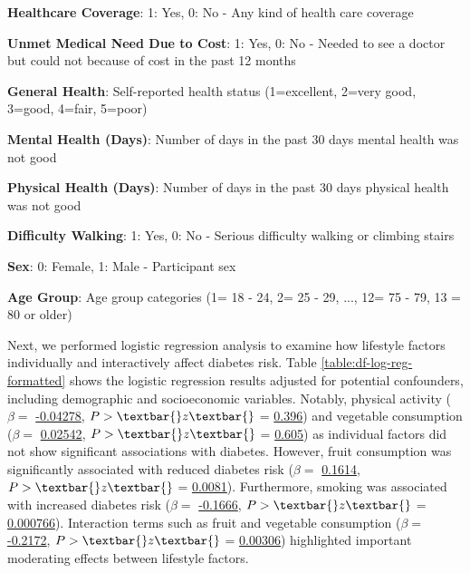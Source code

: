 \documentclass[11pt]{article}
\begin{document}
\begin{table}[h]
\begin{threeparttable}
\begin{tablenotes}
\item \textbf{Healthcare Coverage}: 1: Yes, 0: No - Any kind of health care coverage
\item \textbf{Unmet Medical Need Due to Cost}: 1: Yes, 0: No - Needed to see a doctor but could not because of cost in the past 12 months
\item \textbf{General Health}: Self-reported health status (1=excellent, 2=very good, 3=good, 4=fair, 5=poor)
\item \textbf{Mental Health (Days)}: Number of days in the past 30 days mental health was not good
\item \textbf{Physical Health (Days)}: Number of days in the past 30 days physical health was not good
\item \textbf{Difficulty Walking}: 1: Yes, 0: No - Serious difficulty walking or climbing stairs
\item \textbf{Sex}: 0: Female, 1: Male - Participant sex
\item \textbf{Age Group}: Age group categories (1= 18 - 24, 2= 25 - 29, ..., 12= 75 - 79, 13 = 80 or older)
\end{tablenotes}
\end{threeparttable}
\end{table}


Next, we performed logistic regression analysis to examine how lifestyle factors individually and interactively affect diabetes risk. Table \ref{table:df-log-reg-formatted} shows the logistic regression results adjusted for potential confounders, including demographic and socioeconomic variables. Notably, physical activity (\(\beta =\) \hyperlink{D0a}{-0.04278}, \(P>\textbar{}z\textbar{}\) = \hyperlink{D0d}{0.396}) and vegetable consumption (\(\beta =\) \hyperlink{D3a}{0.02542}, \(P>\textbar{}z\textbar{}\) = \hyperlink{D3d}{0.605}) as individual factors did not show significant associations with diabetes. However, fruit consumption was significantly associated with reduced diabetes risk (\(\beta =\) \hyperlink{D1a}{0.1614}, \(P>\textbar{}z\textbar{}\) = \hyperlink{D1d}{0.0081}). Furthermore, smoking was associated with increased diabetes risk (\(\beta =\) \hyperlink{D7a}{-0.1666}, \(P>\textbar{}z\textbar{}\) = \hyperlink{D7d}{0.000766}). Interaction terms such as fruit and vegetable consumption (\(\beta =\) \hyperlink{D5a}{-0.2172}, \(P>\textbar{}z\textbar{}\) = \hyperlink{D5d}{0.00306}) highlighted important moderating effects between lifestyle factors.

\end{document}
